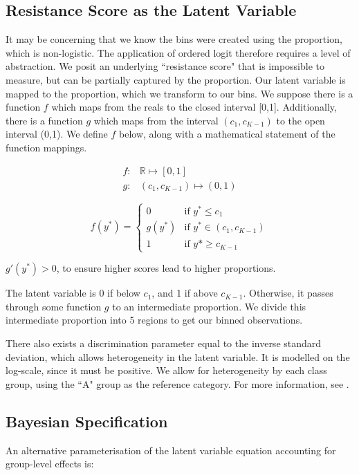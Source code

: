 \documentclass[11pt,twoside]{article}
\numberwithin{Theorem}{section}
\numberwithin{Definition}{section}
\numberwithin{Lemma}{section}
\numberwithin{Algorithm}{section}
\numberwithin{equation}{section}
\begin{document}
\subsection{Resistance Score as the Latent Variable} \label{sec::3_Latent}

It may be concerning that we know the bins were created using the proportion, which is non-logistic. The application of ordered logit therefore requires a level of abstraction. We posit an underlying ``resistance score" that is impossible to measure, but can be partially captured by the proportion. Our latent variable is mapped to the proportion, which we transform to our bins. We suppose there is a function $f$ which maps from the reals to the closed interval [0,1]. Additionally, there is a function $g$ which maps from the interval $(c_1, c_{K-1})$ to the open interval (0,1). We define $f$ below, along with a mathematical statement of the function mappings. 

\begin{align*}
f: &\mathbb{R} \mapsto [0,1] \\
g: &(c_1, c_{K-1}) \mapsto (0,1)
\end{align*}

\[
f(y^*) = 
\begin{cases}
0 & \text{if } y^* \le c_1\\
g(y^*) & \text{if } y^*    \in (c_1, c_{K-1})\\
1 & \text{if } y* \ge c_{K-1}
\end{cases}
\]

$g'(y^*) > 0$, to ensure higher scores lead to higher proportions. 

The latent variable is 0 if below $c_1$, and 1 if above $c_{K-1}$. Otherwise, it passes through some function $g$ to an intermediate proportion. We divide this intermediate proportion into 5 regions to get our binned observations. 

There also exists a discrimination parameter equal to the inverse standard deviation, which allows heterogeneity in the latent variable. It is modelled on the log-scale, since it must be positive. We allow for heterogeneity by each class group, using the ``A" group as the reference category. For more information, see \cite{BurknerVuorre2018}. 

\subsection{Bayesian Specification}

An alternative parameterisation of the latent variable equation accounting for group-level effects is:
\end{document}
